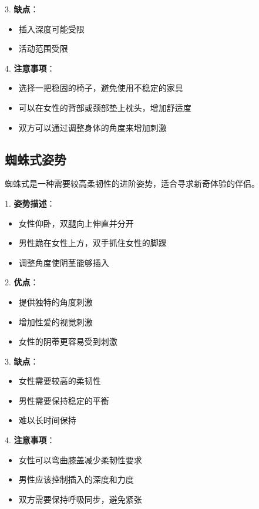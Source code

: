 \documentclass[12pt,UTF8]{ctexbook}
\begin{document}
3. \textbf{缺点}：
  \begin{itemize}
  \item 插入深度可能受限
  \item 活动范围受限
  \end{itemize}

4. \textbf{注意事项}：
  \begin{itemize}
  \item 选择一把稳固的椅子，避免使用不稳定的家具
  \item 可以在女性的背部或颈部垫上枕头，增加舒适度
  \item 双方可以通过调整身体的角度来增加刺激
  \end{itemize}

\subsection{蜘蛛式姿势}

蜘蛛式是一种需要较高柔韧性的进阶姿势，适合寻求新奇体验的伴侣。

1. \textbf{姿势描述}：
  \begin{itemize}
  \item 女性仰卧，双腿向上伸直并分开
  \item 男性跪在女性上方，双手抓住女性的脚踝
  \item 调整角度使阴茎能够插入
  \end{itemize}

2. \textbf{优点}：
  \begin{itemize}
  \item 提供独特的角度刺激
  \item 增加性爱的视觉刺激
  \item 女性的阴蒂更容易受到刺激
  \end{itemize}

3. \textbf{缺点}：
  \begin{itemize}
  \item 女性需要较高的柔韧性
  \item 男性需要保持稳定的平衡
  \item 难以长时间保持
  \end{itemize}

4. \textbf{注意事项}：
  \begin{itemize}
  \item 女性可以弯曲膝盖减少柔韧性要求
  \item 男性应该控制插入的深度和力度
  \item 双方需要保持呼吸同步，避免紧张
  \end{itemize}
\end{document}
